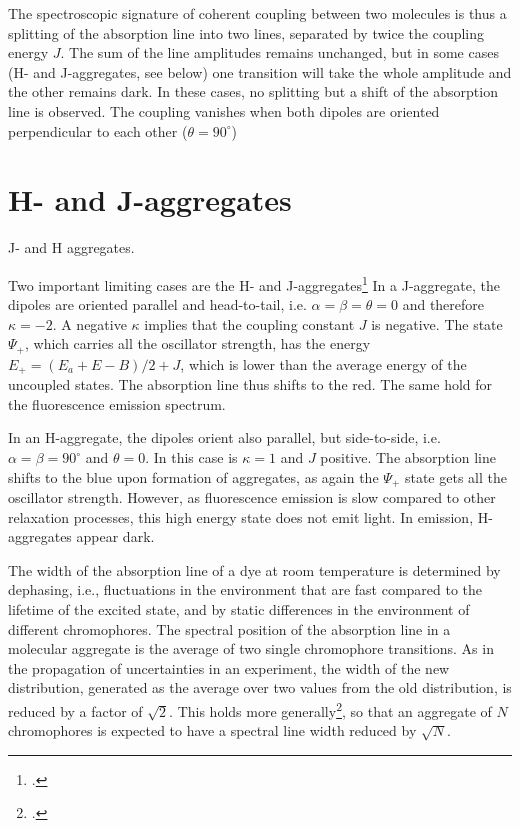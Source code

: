 The spectroscopic signature of coherent coupling between two molecules is thus a splitting of the absorption line into two lines, separated by twice the coupling energy $J$. The sum of the line amplitudes remains unchanged, but in some cases (H- and J-aggregates, see below) one transition will take the whole amplitude and the other remains dark. In these cases, no splitting but a shift of the absorption line is observed. The coupling vanishes when both dipoles are oriented perpendicular to each other ($\theta = 90^\circ$)


\section{H- and J-aggregates}

\begin{marginfigure}

\caption{J- and H aggregates.}
\end{marginfigure}


Two important limiting cases are the H- and J-aggregates\footcite[chapters 2.1.4.3, 2.2.5.3]{KoehlerBaessler2015} In a J-aggregate, the dipoles are oriented parallel and head-to-tail, i.e. $\alpha = \beta = \theta = 0$ and therefore $\kappa = -2$. A negative $\kappa$ implies that the coupling constant $J$ is negative. The state $\Psi_+$, which carries all the oscillator strength, has the energy $E_+ = (E_a + E-B) / 2 + J$, which is lower than the average energy of the uncoupled states. The absorption line thus shifts to the red. The same hold for the fluorescence emission spectrum.

In an H-aggregate, the dipoles orient also parallel, but side-to-side, i.e.  $\alpha = \beta = 90^\circ$ and $\theta = 0$. In this case is $\kappa =1$ and $J$ positive. The absorption line shifts to the blue upon formation of aggregates, as again the  $\Psi_+$ state gets all the oscillator strength. However, as fluorescence emission is slow compared to other relaxation processes, this high energy state does not emit light. In emission, H-aggregates appear dark.

The width of the absorption line of a dye at room temperature is determined by dephasing, i.e., fluctuations in the environment that are fast compared to the lifetime of the excited state, and by static differences in the environment of different chromophores. The spectral position of the absorption line in a molecular aggregate is the average of two single chromophore transitions. As in the propagation of uncertainties in an experiment, the width of the new distribution, generated as the average over two values from the old distribution, is reduced by a factor of $\sqrt{2}$. This holds more generally\footcite{Knapp1984}, so that an aggregate of $N$ chromophores is expected to have a spectral line width reduced by $\sqrt{N}$.




